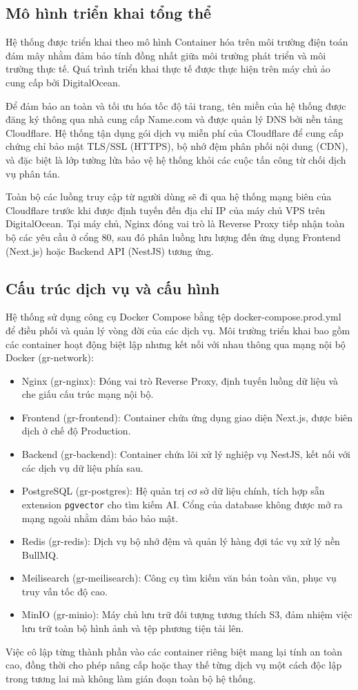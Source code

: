 \subsection{Mô hình triển khai tổng thể}

Hệ thống được triển khai theo mô hình Container hóa trên môi trường điện toán đám mây nhằm đảm bảo tính đồng nhất giữa môi trường phát triển và môi trường thực tế. Quá trình triển khai thực tế được thực hiện trên máy chủ ảo cung cấp bởi DigitalOcean.

Để đảm bảo an toàn và tối ưu hóa tốc độ tải trang, tên miền của hệ thống được đăng ký thông qua nhà cung cấp Name.com và được quản lý DNS bởi nền tảng Cloudflare. Hệ thống tận dụng gói dịch vụ miễn phí của Cloudflare để cung cấp chứng chỉ bảo mật TLS/SSL (HTTPS), bộ nhớ đệm phân phối nội dung (CDN), và đặc biệt là lớp tường lửa bảo vệ hệ thống khỏi các cuộc tấn công từ chối dịch vụ phân tán. 

Toàn bộ các luồng truy cập từ người dùng sẽ đi qua hệ thống mạng biên của Cloudflare trước khi được định tuyến đến địa chỉ IP của máy chủ VPS trên DigitalOcean. Tại máy chủ, Nginx đóng vai trò là Reverse Proxy tiếp nhận toàn bộ các yêu cầu ở cổng 80, sau đó phân luồng lưu lượng đến ứng dụng Frontend (Next.js) hoặc Backend API (NestJS) tương ứng.

\subsection{Cấu trúc dịch vụ và cấu hình}

Hệ thống sử dụng công cụ Docker Compose bằng tệp docker-compose.prod.yml để điều phối và quản lý vòng đời của các dịch vụ. Môi trường triển khai bao gồm các container hoạt động biệt lập nhưng kết nối với nhau thông qua mạng nội bộ Docker (gr-network):

\begin{itemize}
    \item Nginx (gr-nginx): Đóng vai trò Reverse Proxy, định tuyến luồng dữ liệu và che giấu cấu trúc mạng nội bộ.
    \item Frontend (gr-frontend): Container chứa ứng dụng giao diện Next.js, được biên dịch ở chế độ Production.
    \item Backend (gr-backend): Container chứa lõi xử lý nghiệp vụ NestJS, kết nối với các dịch vụ dữ liệu phía sau.
    \item PostgreSQL (gr-postgres): Hệ quản trị cơ sở dữ liệu chính, tích hợp sẵn extension \texttt{pgvector} cho tìm kiếm AI. Cổng của database không được mở ra mạng ngoài nhằm đảm bảo bảo mật.
    \item Redis (gr-redis): Dịch vụ bộ nhớ đệm và quản lý hàng đợi tác vụ xử lý nền BullMQ.
    \item Meilisearch (gr-meilisearch): Công cụ tìm kiếm văn bản toàn văn, phục vụ truy vấn tốc độ cao.
    \item MinIO (gr-minio): Máy chủ lưu trữ đối tượng tương thích S3, đảm nhiệm việc lưu trữ toàn bộ hình ảnh và tệp phương tiện tải lên.
\end{itemize}

Việc cô lập từng thành phần vào các container riêng biệt mang lại tính an toàn cao, đồng thời cho phép nâng cấp hoặc thay thế từng dịch vụ một cách độc lập trong tương lai mà không làm gián đoạn toàn bộ hệ thống.
